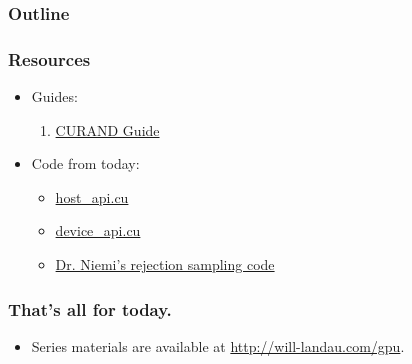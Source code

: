 \documentclass[handout]{beamer}
\numberwithin{equation}{section}
\begin{document}
\begin{frame}
\frametitle{Outline}
\tableofcontents
\end{frame}

\begin{frame}
\frametitle{Resources} \small

\begin{itemize}
\item Guides:
\begin{enumerate}
 \item \href{http://docs.nvidia.com/cuda/pdf/CURAND_Library.pdf}{CURAND Guide}
\end{enumerate}
\pause \item Code from today:
\begin{itemize}
\item \href{http://will-landau.com/gpu/Code/CUDA_C/CURAND/host_api/host_api.cu}{host\_api.cu}
\item \href{http://will-landau.com/gpu/Code/CUDA_C/CURAND/device_api/device_api.cu}{device\_api.cu}
\item \href{https://github.com/jarad/gpuRejectionSampling}{Dr. Niemi's rejection sampling code}
\end{itemize}
\end{itemize}
\end{frame}


\begin{frame}
\frametitle{That's all for today.}
\begin{itemize}
\item Series materials are available at \url{http://will-landau.com/gpu}.
\end{itemize}
\end{frame}
\end{document}
